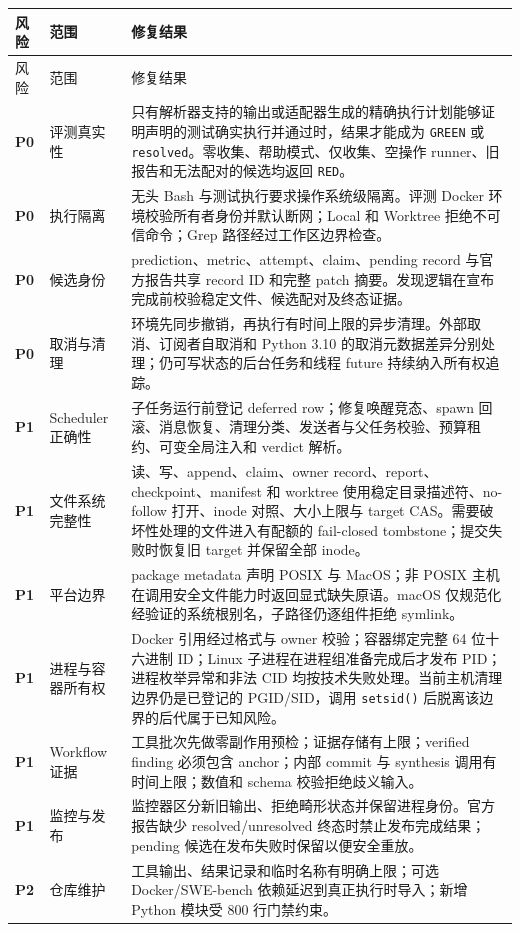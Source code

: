 \documentclass[11pt,a4paper,fontset=fandol]{ctexart}
\newcommand{\PZero}{\textcolor{critical}{\textbf{P0}}}
\newcommand{\POne}{\textcolor{high}{\textbf{P1}}}
\newcommand{\PTwo}{\textcolor{medium}{\textbf{P2}}}
\newcommand{\code}[1]{\texttt{#1}}
\begin{document}
\small
\begin{longtable}{>{\raggedright\arraybackslash}p{1.0cm}>{\raggedright\arraybackslash}p{4.1cm}>{\raggedright\arraybackslash}p{9.0cm}}
\toprule
风险 & 范围 & 修复结果 \\
\midrule
\endfirsthead
\toprule
风险 & 范围 & 修复结果 \\
\midrule
\endhead
\PZero & 评测真实性 & 只有解析器支持的输出或适配器生成的精确执行计划能够证明声明的测试确实执行并通过时，结果才能成为 \code{GREEN} 或 \code{resolved}。零收集、帮助模式、仅收集、空操作 runner、旧报告和无法配对的候选均返回 \code{RED}。 \\
\PZero & 执行隔离 & 无头 Bash 与测试执行要求操作系统级隔离。评测 Docker 环境校验所有者身份并默认断网；Local 和 Worktree 拒绝不可信命令；Grep 路径经过工作区边界检查。 \\
\PZero & 候选身份 & prediction、metric、attempt、claim、pending record 与官方报告共享 record ID 和完整 patch 摘要。发现逻辑在宣布完成前校验稳定文件、候选配对及终态证据。 \\
\PZero & 取消与清理 & 环境先同步撤销，再执行有时间上限的异步清理。外部取消、订阅者自取消和 Python 3.10 的取消元数据差异分别处理；仍可写状态的后台任务和线程 future 持续纳入所有权追踪。 \\
\POne & Scheduler 正确性 & 子任务运行前登记 deferred row；修复唤醒竞态、spawn 回滚、消息恢复、清理分类、发送者与父任务校验、预算租约、可变全局注入和 verdict 解析。 \\
\POne & 文件系统完整性 & 读、写、append、claim、owner record、report、checkpoint、manifest 和 worktree 使用稳定目录描述符、no-follow 打开、inode 对照、大小上限与 target CAS。需要破坏性处理的文件进入有配额的 fail-closed tombstone；提交失败时恢复旧 target 并保留全部 inode。 \\
\POne & 平台边界 & package metadata 声明 POSIX 与 MacOS；非 POSIX 主机在调用安全文件能力时返回显式缺失原语。macOS 仅规范化经验证的系统根别名，子路径仍逐组件拒绝 symlink。 \\
\POne & 进程与容器所有权 & Docker 引用经过格式与 owner 校验；容器绑定完整 64 位十六进制 ID；Linux 子进程在进程组准备完成后才发布 PID；进程枚举异常和非法 CID 均按技术失败处理。当前主机清理边界仍是已登记的 PGID/SID，调用 \code{setsid()} 后脱离该边界的后代属于已知风险。 \\
\POne & Workflow 证据 & 工具批次先做零副作用预检；证据存储有上限；verified finding 必须包含 anchor；内部 commit 与 synthesis 调用有时间上限；数值和 schema 校验拒绝歧义输入。 \\
\POne & 监控与发布 & 监控器区分新旧输出、拒绝畸形状态并保留进程身份。官方报告缺少 resolved/unresolved 终态时禁止发布完成结果；pending 候选在发布失败时保留以便安全重放。 \\
\PTwo & 仓库维护 & 工具输出、结果记录和临时名称有明确上限；可选 Docker/SWE-bench 依赖延迟到真正执行时导入；新增 Python 模块受 800 行门禁约束。 \\
\bottomrule
\end{longtable}
\normalsize
\end{document}
